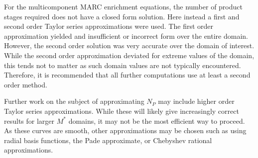 \documentclass{ansconf}
\begin{document}
For the multicomponent MARC enrichment equations, the number of product stages 
required does not have a closed form solution.  Here instead a first and second 
order Taylor series approximations were used.  The first order approximation 
yielded and insufficient or incorrect form over the entire domain.  However, 
the second order solution was very accurate over the domain of interest.  While 
the second order approximation deviated for extreme values of the domain, this 
tends not to matter as such domain values are not typically encountered.  
Therefore, it is recommended that all further computations use at least a second order
method.

Further work on the subject of approximating $N_P$ may include higher order Taylor
series approximations.  While these will likely give increasingly correct results 
for larger $M^*$ domains, it may not be the most efficient way to proceed.  
As these curves are smooth, other approximations may be chosen such as using 
radial basis functions, the Pade approximate, or Chebyshev rational approximations.

\setlength{\baselineskip}{12pt}



\end{document}
